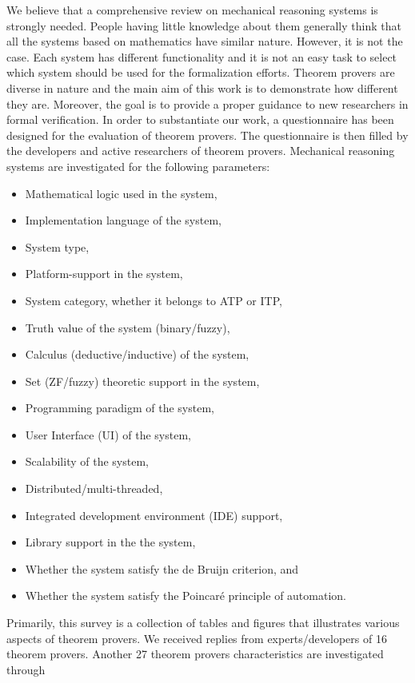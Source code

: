 We believe that a comprehensive review on mechanical reasoning systems is strongly needed. People having little knowledge about them
generally think that all the systems based on mathematics have similar nature. However, it is not the case. Each system has different 
functionality and it is not an easy task to select which system should be used for the formalization efforts. 
Theorem provers are diverse in nature and the
main aim of this work is to demonstrate how different they are. Moreover, the goal is to provide a proper guidance to new 
researchers in formal verification. In order to substantiate our work, a questionnaire has been designed 
for the evaluation of theorem provers. The questionnaire is then filled by 
the developers and active researchers of theorem provers. Mechanical reasoning systems are investigated for the following parameters:
\begin{itemize}
\item Mathematical logic used in the system,
\item Implementation language of the system,
\item System type,
\item Platform-support in the system,
\item System category, whether it belongs to ATP or ITP,
\item Truth value of the system (binary/fuzzy),
\item Calculus (deductive/inductive) of the system,
\item Set (ZF/fuzzy) theoretic support in the system,
\item Programming paradigm of the system,
\item User Interface (UI) of the system,
\item Scalability of the system,
\item Distributed/multi-threaded,
\item Integrated development environment (IDE) support,
\item Library support in the the system,
\item Whether the system satisfy the de Bruijn criterion, and 
\item Whether the system satisfy the Poincar{\'e} principle of automation.
\end{itemize}
Primarily, this survey is a collection of tables and figures that illustrates various aspects of theorem provers. We 
received replies from experts/developers of 16 theorem provers. Another 27 theorem provers characteristics are investigated through 
